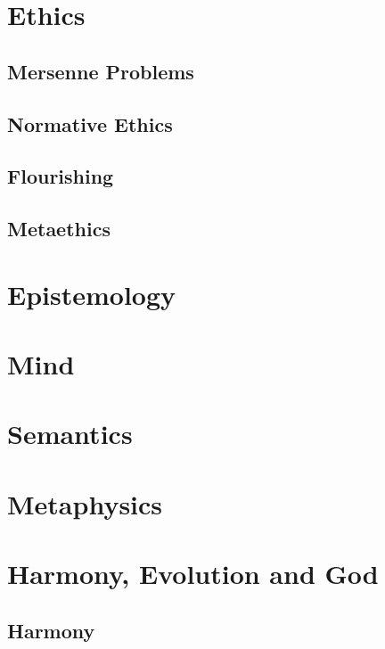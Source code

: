 \def\mychapter{II}

\chapter{Ethics}\label{ch:ethics}
\section{Mersenne Problems}
\section{Normative Ethics}
\section{Flourishing}
\section{Metaethics}
\chaptertail 

\def\mychapter{III}

\chapter{Epistemology}\label{ch:epistemology}
\chaptertail 

\def\mychapter{IV}

\chapter{Mind}\label{ch:mind}
\chaptertail 

\def\mychapter{V}

\chapter{Semantics}\label{ch:semantics}
\chaptertail

\def\mychapter{VI}

\chapter{Metaphysics}\label{ch:metaphysics}
\chaptertail 

\def\mychapter{VII}

\chapter{Harmony, Evolution and God}\label{ch:God}
\section{Harmony}
